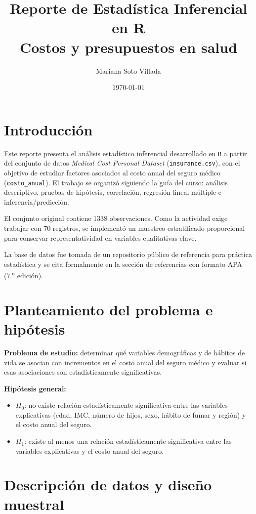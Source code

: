 \documentclass[12pt,a4paper]{article}
\title{\textbf{Reporte de Estadística Inferencial en R}\\
\large Costos y presupuestos en salud}
\author{Mariana Soto Villada}
\date{\today}
\begin{document}
\maketitle
\tableofcontents
\newpage

\section{Introducción}
Este reporte presenta el análisis estadístico inferencial desarrollado en \texttt{R} a partir del conjunto de datos \textit{Medical Cost Personal Dataset} (\texttt{insurance.csv}), con el objetivo de estudiar factores asociados al costo anual del seguro médico (\texttt{costo\_anual}). El trabajo se organizó siguiendo la guía del curso: análisis descriptivo, pruebas de hipótesis, correlación, regresión lineal múltiple e inferencia/predicción.

El conjunto original contiene 1338 observaciones. Como la actividad exige trabajar con 70 registros, se implementó un muestreo estratificado proporcional para conservar representatividad en variables cualitativas clave.

La base de datos fue tomada de un repositorio público de referencia para práctica estadística y se cita formalmente en la sección de referencias con formato APA (7.\textsuperscript{a} edición).

\section{Planteamiento del problema e hipótesis}
\textbf{Problema de estudio:} determinar qué variables demográficas y de hábitos de vida se asocian con incrementos en el costo anual del seguro médico y evaluar si esas asociaciones son estadísticamente significativas.

\textbf{Hipótesis general:}
\begin{itemize}
    \item \(H_0\): no existe relación estadísticamente significativa entre las variables explicativas (edad, IMC, número de hijos, sexo, hábito de fumar y región) y el costo anual del seguro.
    \item \(H_1\): existe al menos una relación estadísticamente significativa entre las variables explicativas y el costo anual del seguro.
\end{itemize}

\section{Descripción de datos y diseño muestral}
\end{document}
